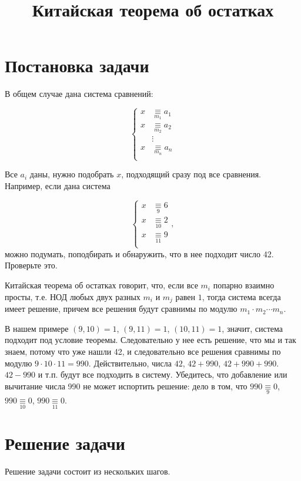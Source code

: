 \documentclass{article}
\title{Китайская теорема об остатках}
\author{}
\date{}
\newcommand{\eqmod}[1]{\mathbin{\underset{#1}\equiv}}
\begin{document}
\maketitle

\section{Постановка задачи}

В общем случае дана система сравнений:

\[
\left\{
\begin{aligned}
x & \eqmod{m_1} a_1 \\
x & \eqmod{m_2} a_2 \\
& \vdots \\
x & \eqmod{m_n} a_n \\
\end{aligned}
\right.
\]

Все $a_i$ даны, нужно подобрать $x$, подходящий сразу под все сравнения.
Например, если дана система

\[
\left\{
\begin{aligned}
x & \eqmod{9} 6 \\
x & \eqmod{10} 2 \\
x & \eqmod{11} 9 \\
\end{aligned}
\right.,
\]
можно подумать, поподбирать и обнаружить, что в нее подходит число 42. Проверьте это.

Китайская теорема об остатках говорит, что, если все $m_i$ попарно взаимно просты,
т.е. НОД любых двух разных $m_i$ и $m_j$ равен $1$, тогда система всегда имеет решение,
причем все решения будут сравнимы по модулю $m_1\cdot m_2\cdots m_n$.

В нашем примере $(9, 10)=1$, $(9, 11)=1$, $(10, 11)=1$, значит, система подходит под условие
теоремы. Следовательно у нее есть решение, что мы и так знаем, потому что уже нашли 42,
и следовательно все решения сравнимы по модулю $9\cdot10\cdot11=990$. Действительно, числа
$42$, $42+990$, $42 + 990 + 990$. $42 - 990$ и т.п. будут все подходить в систему. Убедитесь, что
добавление или вычитание числа 990 не может испортить решение: дело в том, что $990\eqmod{9}0$,
$990\eqmod{10}0$, $990\eqmod{11}0$.

\section{Решение задачи}

Решение задачи состоит из нескольких шагов.
\end{document}
